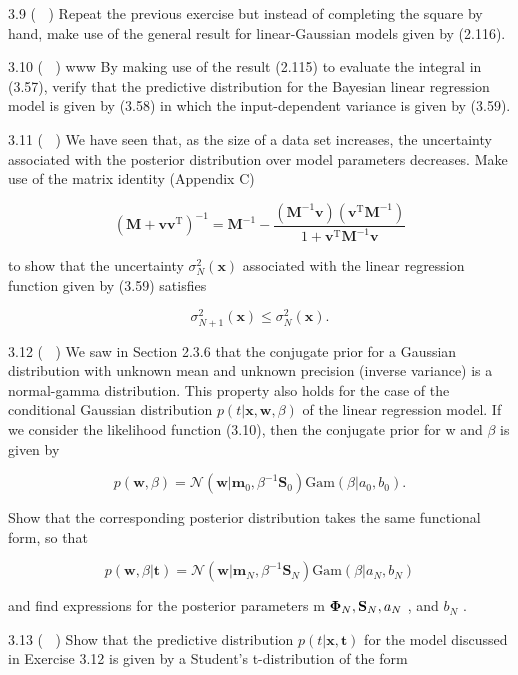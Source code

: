 \documentclass[
  10
]{article}
\begin{document}
3.9 ( ) Repeat the previous exercise but instead of completing the
square by hand, make use of the general result for linear-Gaussian
models given by (2.116).

3.10 ( ) www By making use of the result (2.115) to evaluate the
integral in (3.57), verify that the predictive distribution for the
Bayesian linear regression model is given by (3.58) in which the
input-dependent variance is given by (3.59).

3.11 ( ) We have seen that, as the size of a data set increases, the
uncertainty associated with the posterior distribution over model
parameters decreases. Make use of the matrix identity (Appendix C)

\[
\left(\mathbf {M} + \mathbf {v v} ^ {\mathrm{T}}\right) ^ {- 1} = \mathbf {M} ^ {- 1} - \frac {\left(\mathbf {M} ^ {- 1} \mathbf {v}\right) \left(\mathbf {v} ^ {\mathrm{T}} \mathbf {M} ^ {- 1}\right)}{1 + \mathbf {v} ^ {\mathrm{T}} \mathbf {M} ^ {- 1} \mathbf {v}}\tag{3.110}
\]

to show that the uncertainty
\(\sigma _ { N } ^ { 2 } ( \mathbf { x } )\) associated with the linear
regression function given by (3.59) satisfies

\[
\sigma_ {N + 1} ^ {2} (\mathbf {x}) \leqslant \sigma_ {N} ^ {2} (\mathbf {x}).\tag{3.111}
\]

3.12 ( ) We saw in Section 2.3.6 that the conjugate prior for a Gaussian
distribution with unknown mean and unknown precision (inverse variance)
is a normal-gamma distribution. This property also holds for the case of
the conditional Gaussian distribution
\(p ( t | \mathbf { x } , \mathbf { w } , \beta )\) of the linear
regression model. If we consider the likelihood function (3.10), then
the conjugate prior for w and \(\beta\) is given by

\[
p (\mathbf {w}, \beta) = \mathcal {N} (\mathbf {w} | \mathbf {m} _ {0}, \beta^ {- 1} \mathbf {S} _ {0}) \mathrm{Gam} (\beta | a _ {0}, b _ {0}).\tag{3.112}
\]

Show that the corresponding posterior distribution takes the same
functional form, so that

\[
p (\mathbf {w}, \beta | \mathbf {t}) = \mathcal {N} (\mathbf {w} | \mathbf {m} _ {N}, \beta^ {- 1} \mathbf {S} _ {N}) \mathrm{Gam} (\beta | a _ {N}, b _ {N})\tag{3.113}
\]

and find expressions for the posterior parameters m
\({ \bf \Phi } _ { N } , { \bf S } _ { N } , a _ { N }\) , and
\(b _ { N }\) .

3.13 ( ) Show that the predictive distribution
\(p ( t | \mathbf { x } , \mathbf { t } )\) for the model discussed in
Exercise 3.12 is given by a Student's t-distribution of the form
\end{document}
